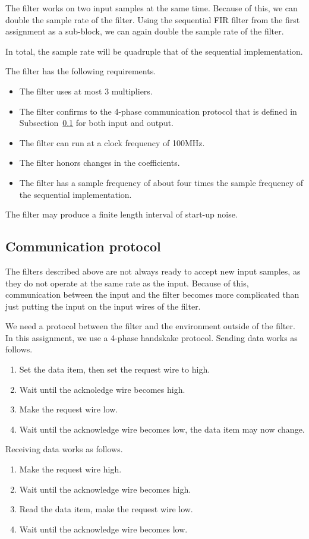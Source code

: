 The filter works on two input samples at the same time.
Because of this, we can double the sample rate of the filter.
Using the sequential FIR filter from the first assignment as a sub-block, we can again double the sample rate of the filter.

In total, the sample rate will be quadruple that of the sequential implementation.

The filter has the following requirements.

\begin{itemize}
	\item The filter uses at most 3 multipliers.
	\item The filter confirms to the 4-phase communication protocol that is defined in Subsection~\ref{sec:analysis:communication} for both input and output.
	\item The filter can run at a clock frequency of 100MHz.
	\item The filter honors changes in the coefficients.
	\item The filter has a sample frequency of about four times the sample frequency of the sequential implementation.
\end{itemize}

The filter may produce a finite length interval of start-up noise.

\subsection{Communication protocol}
\label{sec:analysis:communication}

The filters described above are not always ready to accept new input samples, as they do not operate at the same rate as the input.
Because of this, communication between the input and the filter becomes more complicated than just putting the input on the input wires of the filter.

We need a protocol between the filter and the environment outside of the filter.
In this assignment, we use a 4-phase handskake protocol.
Sending data works as follows.

\begin{enumerate}
	\item Set the data item, then set the request wire to high.
	\item Wait until the acknoledge wire becomes high.
	\item Make the request wire low.
	\item Wait until the acknowledge wire becomes low, the data item may now change.
\end{enumerate}

Receiving data works as follows.

\begin{enumerate}
	\item Make the request wire high.
	\item Wait until the acknowledge wire becomes high.
	\item Read the data item, make the request wire low.
	\item Wait until the acknowledge wire becomes low.
\end{enumerate}
